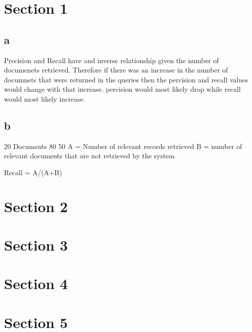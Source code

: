\documentclass{report}
\begin{document}
\chapter{Section 1}

\section{a}

\par 
Precision and Recall have and inverse relationship given the number  of documenets retrieved. Therefore if there was an increase in the number of documnets that were returned in the queries then the percision and recall values would change with that increase. percision would most likely drop while recall would most likely increase.

\section{b}

20 Documents
80%
50%
A = Number of relevant records retrieved
B = number of relevant documents that are not retrieved by the system

Recall = A/(A+B)

\chapter{Section 2}

\chapter{Section 3}

\chapter{Section 4}

\chapter{Section 5}
\end{document}
